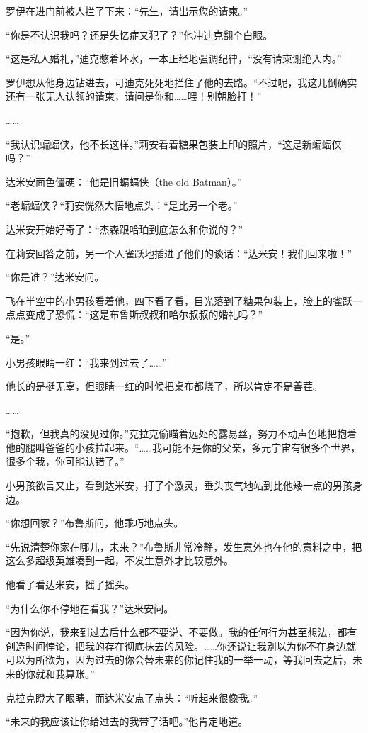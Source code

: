 \documentclass[../main]{subfiles}
\begin{document}
罗伊在进门前被人拦了下来：“先生，请出示您的请柬。”

“你是不认识我吗？还是失忆症又犯了？”他冲迪克翻个白眼。

“这是私人婚礼，”迪克憋着坏水，一本正经地强调纪律，“没有请柬谢绝入内。”

罗伊想从他身边钻进去，可迪克死死地拦住了他的去路。“不过呢，我这儿倒确实还有一张无人认领的请柬，请问是你和……喂！别朝脸打！”

……

“我认识蝙蝠侠，他不长这样。”莉安看着糖果包装上印的照片，“这是新蝙蝠侠吗？”

达米安面色僵硬：“他是旧蝙蝠侠（the old Batman）。”

“老蝙蝠侠？“莉安恍然大悟地点头：“是比另一个老。”

达米安开始好奇了：“杰森跟哈珀到底怎么和你说的？”

在莉安回答之前，另一个人雀跃地插进了他们的谈话：“达米安！我们回来啦！”

“你是谁？”达米安问。

飞在半空中的小男孩看着他，四下看了看，目光落到了糖果包装上，脸上的雀跃一点点变成了恐慌：“这是布鲁斯叔叔和哈尔叔叔的婚礼吗？”

“是。”

小男孩眼睛一红：“我来到过去了……”

他长的是挺无辜，但眼睛一红的时候把桌布都烧了，所以肯定不是善茬。

……

“抱歉，但我真的没见过你。”克拉克偷瞄着远处的露易丝，努力不动声色地把抱着他的腿叫爸爸的小孩拉起来。“……我可能不是你的父亲，多元宇宙有很多个世界，很多个我，你可能认错了。”

小男孩欲言又止，看到达米安，打了个激灵，垂头丧气地站到比他矮一点的男孩身边。

“你想回家？”布鲁斯问，他乖巧地点头。

“先说清楚你家在哪儿，未来？”布鲁斯非常冷静，发生意外也在他的意料之中，把这么多超级英雄凑到一起，不发生意外才比较意外。

他看了看达米安，摇了摇头。

“为什么你不停地在看我？”达米安问。

“因为你说，我来到过去后什么都不要说、不要做。我的任何行为甚至想法，都有创造时间悖论，把我的存在彻底抹去的风险。……你还说让我别以为你不在身边就可以为所欲为，因为过去的你会替未来的你记住我的一举一动，等我回去之后，未来的你就和我算账。”

克拉克瞪大了眼睛，而达米安点了点头：“听起来很像我。”

“未来的我应该让你给过去的我带了话吧。”他肯定地道。
\end{document}
